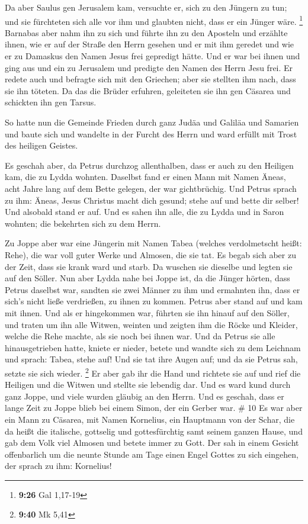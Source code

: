  Da aber Saulus gen Jerusalem kam, versuchte er, sich zu
den Jüngern zu tun; und sie fürchteten sich alle vor ihm und glaubten
nicht, dass er ein Jünger wäre. \footnote{\textbf{9:26} Gal 1,17-19}
 Barnabas aber nahm ihn zu sich und führte ihn zu den
Aposteln und erzählte ihnen, wie er auf der Straße den Herrn gesehen und
er mit ihm geredet und wie er zu Damaskus den Namen Jesus frei gepredigt
hätte.  Und er war bei ihnen und ging aus und ein zu
Jerusalem und predigte den Namen des Herrn Jesu frei.  Er
redete auch und befragte sich mit den Griechen; aber sie stellten ihm
nach, dass sie ihn töteten.  Da das die Brüder erfuhren,
geleiteten sie ihn gen Cäsarea und schickten ihn gen Tarsus.

 So hatte nun die Gemeinde Frieden durch ganz Judäa und
Galiläa und Samarien und baute sich und wandelte in der Furcht des Herrn
und ward erfüllt mit Trost des heiligen Geistes.

 Es geschah aber, da Petrus durchzog allenthalben, dass
er auch zu den Heiligen kam, die zu Lydda wohnten. 
Daselbst fand er einen Mann mit Namen Äneas, acht Jahre lang auf dem
Bette gelegen, der war gichtbrüchig.  Und Petrus sprach
zu ihm: Äneas, Jesus Christus macht dich gesund; stehe auf und bette dir
selber! Und alsobald stand er auf.  Und es sahen ihn
alle, die zu Lydda und in Saron wohnten; die bekehrten sich zu dem
Herrn.

 Zu Joppe aber war eine Jüngerin mit Namen Tabea (welches
verdolmetscht heißt: Rehe), die war voll guter Werke und Almosen, die
sie tat.  Es begab sich aber zu der Zeit, dass sie krank
ward und starb. Da wuschen sie dieselbe und legten sie auf den Söller.
 Nun aber Lydda nahe bei Joppe ist, da die Jünger hörten,
dass Petrus daselbst war, sandten sie zwei Männer zu ihm und ermahnten
ihn, dass er sich's nicht ließe verdrießen, zu ihnen zu kommen.
 Petrus aber stand auf und kam mit ihnen. Und als er
hingekommen war, führten sie ihn hinauf auf den Söller, und traten um
ihn alle Witwen, weinten und zeigten ihm die Röcke und Kleider, welche
die Rehe machte, als sie noch bei ihnen war.  Und da
Petrus sie alle hinausgetrieben hatte, kniete er nieder, betete und
wandte sich zu dem Leichnam und sprach: Tabea, stehe auf! Und sie tat
ihre Augen auf; und da sie Petrus sah, setzte sie sich wieder.
\footnote{\textbf{9:40} Mk 5,41}  Er aber gab ihr die
Hand und richtete sie auf und rief die Heiligen und die Witwen und
stellte sie lebendig dar.  Und es ward kund durch ganz
Joppe, und viele wurden gläubig an den Herrn.  Und es
geschah, dass er lange Zeit zu Joppe blieb bei einem Simon, der ein
Gerber war. \# 10  Es war aber ein Mann zu Cäsarea, mit
Namen Kornelius, ein Hauptmann von der Schar, die da heißt die
italische,  gottselig und gottesfürchtig samt seinem
ganzen Hause, und gab dem Volk viel Almosen und betete immer zu Gott.
 Der sah in einem Gesicht offenbarlich um die neunte
Stunde am Tage einen Engel Gottes zu sich eingehen, der sprach zu ihm:
Kornelius!

